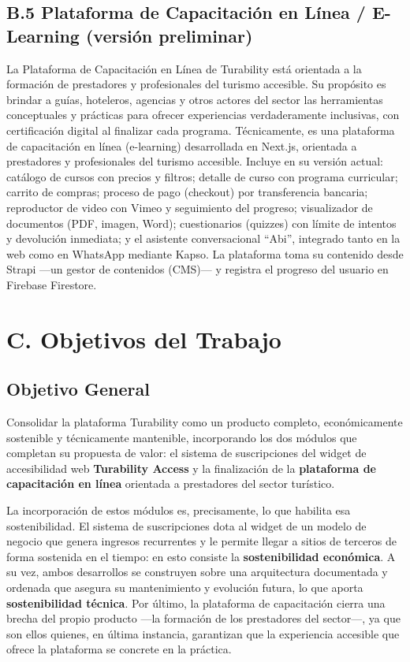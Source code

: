 \documentclass[12pt,a4paper]{article}
\begin{document}
\subsection*{B.5 Plataforma de Capacitación en Línea / E-Learning (versión preliminar)}

La Plataforma de Capacitación en Línea de Turability está orientada a la formación de prestadores y profesionales del turismo accesible. Su propósito es brindar a guías, hoteleros, agencias y otros actores del sector las herramientas conceptuales y prácticas para ofrecer experiencias verdaderamente inclusivas, con certificación digital al finalizar cada programa. Técnicamente, es una plataforma de capacitación en línea (e-learning) desarrollada en Next.js, orientada a prestadores y
profesionales del turismo accesible. Incluye en su versión actual: catálogo de cursos con
precios y filtros; detalle de curso con programa curricular; carrito de compras; proceso de
pago (checkout) por transferencia bancaria; reproductor de video con Vimeo y seguimiento del
progreso; visualizador de documentos (PDF, imagen, Word); cuestionarios (quizzes) con límite de intentos y
devolución inmediata; y el asistente conversacional ``Abi'', integrado tanto en la web como en WhatsApp mediante
Kapso. La plataforma toma su contenido desde Strapi —un gestor de contenidos (CMS)— y registra el progreso del usuario
en Firebase Firestore.

\section*{C. Objetivos del Trabajo}

\subsection*{Objetivo General}

Consolidar la plataforma Turability como un producto completo, económicamente sostenible y
técnicamente mantenible, incorporando los dos módulos que completan su propuesta de valor: el
sistema de suscripciones del widget de accesibilidad web \textbf{Turability Access} y la finalización
de la \textbf{plataforma de capacitación en línea} orientada a prestadores del sector turístico.

La incorporación de estos módulos es, precisamente, lo que habilita esa sostenibilidad. El
sistema de suscripciones dota al widget de un modelo de negocio que genera ingresos recurrentes
y le permite llegar a sitios de terceros de forma sostenida en el tiempo: en esto consiste la
\textbf{sostenibilidad económica}. A su vez, ambos desarrollos se construyen sobre una arquitectura
documentada y ordenada que asegura su mantenimiento y evolución futura, lo que aporta
\textbf{sostenibilidad técnica}. Por último, la plataforma de capacitación cierra una brecha del propio
producto —la formación de los prestadores del sector—, ya que son ellos quienes, en última
instancia, garantizan que la experiencia accesible que ofrece la plataforma se concrete en la
práctica.
\end{document}
